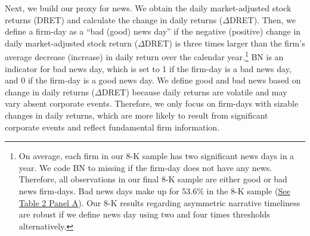 \documentclass[letterpaper,12pt]{article}
\begin{document}
\begin{spacing}{1.5}
Next, we build our proxy for news. We obtain the daily market-adjusted stock returns (DRET) and calculate the change in daily returns ($\Delta$DRET). Then, we define a firm-day as a ``bad (good) news day” if the negative (positive) change in daily market-adjusted stock return ($\Delta$DRET) is three times larger than the firm's average decrease (increase) in daily return over the calendar year.\footnote{On average, each firm in our 8-K sample has two significant news days in a year. We code BN to missing if the firm-day does not have any news. Therefore, all observations in our final 8-K sample are either good or bad news firm-days. Bad news days make up for 53.6\% in the 8-K sample (\hyperref[T2PA]{See Table 2 Panel A}). Our 8-K results regarding asymmetric narrative timeliness are robust if we define news day using two and four times thresholds alternatively.} BN is an indicator for bad news day, which is set to 1 if the firm-day is a bad news day, and 0 if the firm-day is a good news day. We define good and bad news based on change in daily returns ($\Delta$DRET) because daily returns are volatile and may vary absent corporate events. Therefore, we only focus on firm-days with sizable changes in daily returns, which are more likely to result from significant corporate events and reflect fundamental firm information.


\end{spacing}
\end{document}
